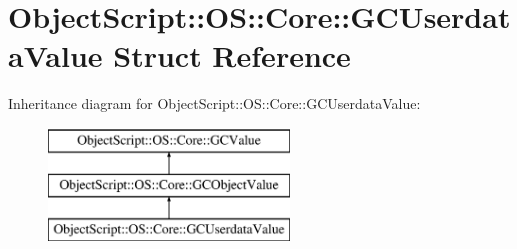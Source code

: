 \hypertarget{struct_object_script_1_1_o_s_1_1_core_1_1_g_c_userdata_value}{}\section{Object\+Script\+:\+:OS\+:\+:Core\+:\+:G\+C\+Userdata\+Value Struct Reference}
\label{struct_object_script_1_1_o_s_1_1_core_1_1_g_c_userdata_value}
Inheritance diagram for Object\+Script\+:\+:OS\+:\+:Core\+:\+:G\+C\+Userdata\+Value\+:\begin{figure}[H]
\begin{center}
\leavevmode
\includegraphics[height=3.000000cm]{struct_object_script_1_1_o_s_1_1_core_1_1_g_c_userdata_value}
\end{center}
\end{figure}
